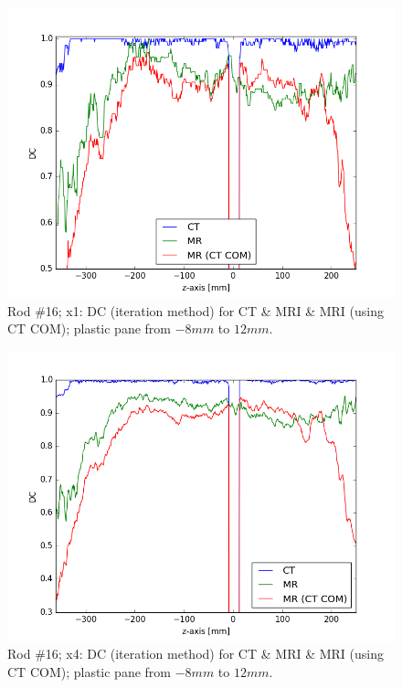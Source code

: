 \begin{figure}[!tbh]
    \centering
    \includegraphics[scale=0.6]{../fig/python/ph3_v2/dice/ph3_MR_v2_x1_DC_iter.png}
    \caption[Rod \#16; x1: DC (iteration method) for CT \& MRI \& MRI (using CT COM).]{Rod \#16; x1: DC (iteration method) for CT \& MRI \& MRI (using CT COM); plastic pane from $-8mm$ to $12mm$.}
    \label{fig:ph3_DC_x1}
\end{figure}

\begin{figure}[!tbh]
    \centering
    \includegraphics[scale=0.6]{../fig/python/ph3_v2/dice/ph3_MR_v2_x4_DC_iter.png}
    \caption[Rod \#16; x4: DC (iteration method) for CT \& MRI \& MRI (using CT COM).]{Rod \#16; x4: DC (iteration method) for CT \& MRI \& MRI (using CT COM); plastic pane from $-8mm$ to $12mm$.}
    \label{fig:ph3_DC_x4}
\end{figure}